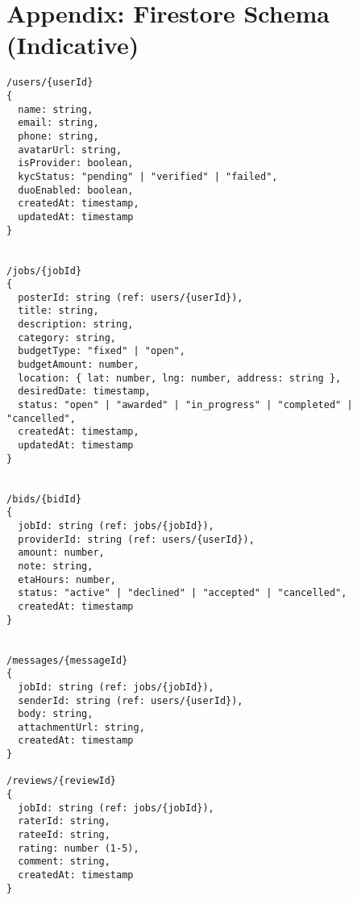 \documentclass[11pt]{article}
\begin{document}
\newpage

\section*{Appendix: Firestore Schema (Indicative)}
\begin{lstlisting}[caption={Firestore Collections \& Example Documents}]
/users/{userId}
{
  name: string,
  email: string,
  phone: string,
  avatarUrl: string,
  isProvider: boolean,
  kycStatus: "pending" | "verified" | "failed",
  duoEnabled: boolean,
  createdAt: timestamp,
  updatedAt: timestamp
}


/jobs/{jobId}
{
  posterId: string (ref: users/{userId}),
  title: string,
  description: string,
  category: string,
  budgetType: "fixed" | "open",
  budgetAmount: number,
  location: { lat: number, lng: number, address: string },
  desiredDate: timestamp,
  status: "open" | "awarded" | "in_progress" | "completed" | "cancelled",
  createdAt: timestamp,
  updatedAt: timestamp
}


/bids/{bidId}
{
  jobId: string (ref: jobs/{jobId}),
  providerId: string (ref: users/{userId}),
  amount: number,
  note: string,
  etaHours: number,
  status: "active" | "declined" | "accepted" | "cancelled",
  createdAt: timestamp
}


/messages/{messageId}
{
  jobId: string (ref: jobs/{jobId}),
  senderId: string (ref: users/{userId}),
  body: string,
  attachmentUrl: string,
  createdAt: timestamp
}

/reviews/{reviewId}
{
  jobId: string (ref: jobs/{jobId}),
  raterId: string,
  rateeId: string,
  rating: number (1-5),
  comment: string,
  createdAt: timestamp
}
\end{lstlisting}
\end{document}
